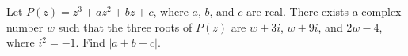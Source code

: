 Let $ P(z) = z^3 + az^2 + bz + c$, where $ a$, $ b$, and $ c$ are real. There exists a complex number $ w$ such that the three roots of $ P(z)$ are $ w + 3i$, $ w + 9i$, and $ 2w - 4$, where $ i^2 = - 1$. Find $ |a + b + c|$.